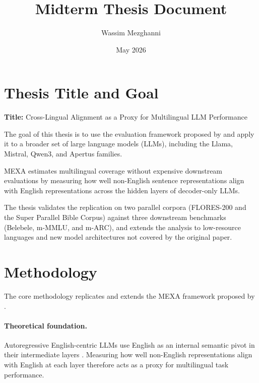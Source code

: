 \documentclass{article}
\title{Midterm Thesis Document}
\author{Wassim Mezghanni}
\date{May 2026}
\begin{document}
\maketitle


\section{Thesis Title and Goal}
\label{sec:goal}

\textbf{Title:} Cross-Lingual Alignment as a Proxy for Multilingual LLM Performance

\medskip

The goal of this thesis is to use the evaluation framework proposed by
\citet{kargaran2025mexa} and apply it to a broader set of large language
models (LLMs), including the Llama, Mistral, Qwen3, and Apertus families.

MEXA estimates multilingual coverage without expensive downstream evaluations
by measuring how well non-English sentence representations align with English
representations across the hidden layers of decoder-only LLMs.

The thesis validates the replication on two parallel corpora
(FLORES-200 and the Super Parallel Bible Corpus) against three downstream
benchmarks (Belebele, m-MMLU, and m-ARC), and extends the analysis to
low-resource languages and new model architectures not covered by the
original paper.


\section{Methodology}
\label{sec:methodology}

The core methodology replicates and extends the MEXA framework
proposed by \citet{kargaran2025mexa}.

\paragraph{Theoretical foundation.}

Autoregressive English-centric LLMs use English as an internal semantic pivot
in their intermediate layers \citep{wendler2024llamas,zhao2024multilingualism}.
Measuring how well non-English representations align with English at each
layer therefore acts as a proxy for multilingual task performance.
\end{document}

